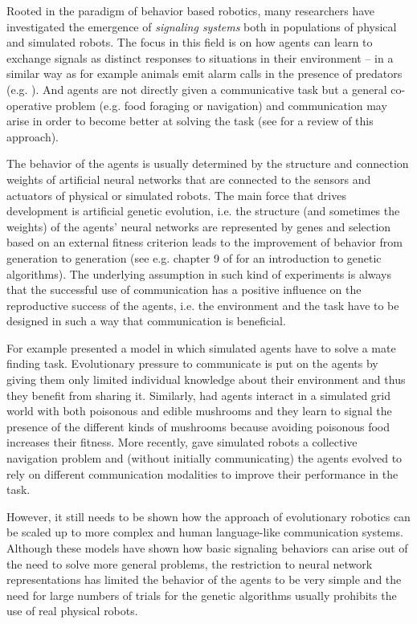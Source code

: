 Rooted in the paradigm of behavior based robotics, many researchers
have investigated the emergence of \emph{signaling systems} both in
populations of physical and simulated robots. The focus in this field
is on how agents can learn to exchange signals as distinct responses
to situations in their environment -- in a similar way as for example
animals emit alarm calls in the presence of predators
(e.g. \citealp{seyfarth80monkey}). And agents are not directly given a
communicative task but a general co-operative problem (e.g. food
foraging or navigation) and communication may arise in order to become
better at solving the task (see \citealp{nolfi05emergence} for a
review of this approach).

The behavior of the agents is usually determined by the structure and
connection weights of artificial neural networks that are connected to
the sensors and actuators of physical or simulated robots. The main
force that drives development is artificial genetic evolution,
i.e. the structure (and sometimes the weights) of the agents' neural
networks are represented by genes and selection based on an external
fitness criterion leads to the improvement of behavior from generation
to generation (see e.g. chapter 9 of \citealp{mitchell97machine} for
an introduction to genetic algorithms). The underlying assumption in
such kind of experiments is always that the successful use of
communication has a positive influence on the reproductive success of
the agents, i.e. the environment and the task have to be designed in
such a way that communication is beneficial.

For example \cite{werner92evolution} presented a model in which
simulated agents have to solve a mate finding task. Evolutionary
pressure to communicate is put on the agents by giving them only
limited individual knowledge about their environment and thus they
benefit from sharing it. Similarly, \cite{cangelosi98emergence} had
agents interact in a simulated grid world with both poisonous and
edible mushrooms and they learn to signal the presence of the
different kinds of mushrooms because avoiding poisonous food increases
their fitness. More recently, \cite{marocco07emergence} gave simulated
robots a collective navigation problem and (without initially
communicating) the agents evolved to rely on different communication
modalities to improve their performance in the task. 

However, it still needs to be shown how the approach of evolutionary
robotics can be scaled up to more complex and human language-like
communication systems. Although these models have shown how basic
signaling behaviors can arise out of the need to solve more general
problems, the restriction to neural network representations has
limited the behavior of the agents to be very simple and the need for
large numbers of trials for the genetic algorithms usually prohibits
the use of real physical robots.



